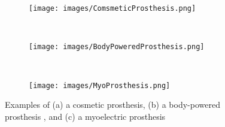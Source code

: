  \begin{figure}[htb!]
    \centering
    \begin{subfigure}[b]{0.3\textwidth}
        \texttt{[image: images/ComsmeticProsthesis.png]}
        \caption{}
        \label{fig:cosmetic_prosthesis}
    \end{subfigure}
    ~
    \begin{subfigure}[b]{0.3\textwidth}
        \texttt{[image: images/BodyPoweredProsthesis.png]}
        \caption{}
        \label{fig:body_powered_prosthesis}
    \end{subfigure}
    ~ 
    \begin{subfigure}[b]{0.3\textwidth}
        \texttt{[image: images/MyoProsthesis.png]}
        \caption{}
        \label{fig:myoelectric_prosthesis}
    \end{subfigure}
    \caption{Examples of (a) a cosmetic prosthesis, (b) a body-powered prosthesis \cite{hosmer}, and (c) a myoelectric prosthesis \cite{ottobock_michelangelo}}
    \label{fig:prosthesis_examples}
\end{figure}




